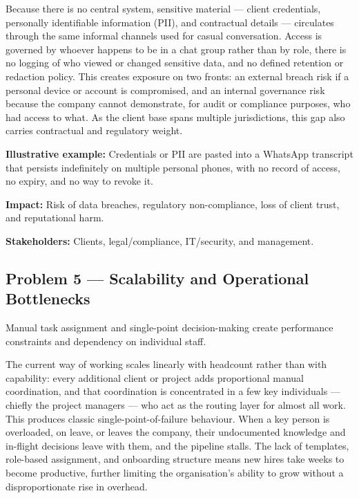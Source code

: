 \documentclass[12pt,a4paper]{report}
\begin{document}
Because there is no central system, sensitive material --- client credentials, personally identifiable information (PII), and contractual details --- circulates through the same informal channels used for casual conversation. Access is governed by whoever happens to be in a chat group rather than by role, there is no logging of who viewed or changed sensitive data, and no defined retention or redaction policy. This creates exposure on two fronts: an external breach risk if a personal device or account is compromised, and an internal governance risk because the company cannot demonstrate, for audit or compliance purposes, who had access to what. As the client base spans multiple jurisdictions, this gap also carries contractual and regulatory weight.

\textbf{Illustrative example:} Credentials or PII are pasted into a WhatsApp transcript that persists indefinitely on multiple personal phones, with no record of access, no expiry, and no way to revoke it.

\textbf{Impact:} Risk of data breaches, regulatory non-compliance, loss of client trust, and reputational harm.

\textbf{Stakeholders:} Clients, legal/compliance, IT/security, and management.

\subsection{Problem 5 --- Scalability and Operational Bottlenecks}
\begin{problemBox}
Manual task assignment and single-point decision-making create performance constraints and dependency on individual staff.
\end{problemBox}

The current way of working scales linearly with headcount rather than with capability: every additional client or project adds proportional manual coordination, and that coordination is concentrated in a few key individuals --- chiefly the project managers --- who act as the routing layer for almost all work. This produces classic single-point-of-failure behaviour. When a key person is overloaded, on leave, or leaves the company, their undocumented knowledge and in-flight decisions leave with them, and the pipeline stalls. The lack of templates, role-based assignment, and onboarding structure means new hires take weeks to become productive, further limiting the organisation's ability to grow without a disproportionate rise in overhead.
\end{document}
